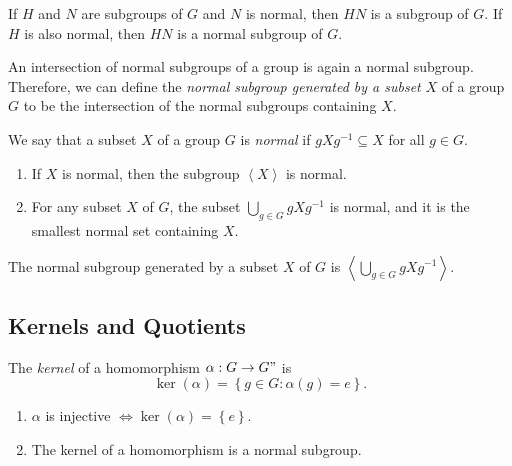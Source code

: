 \begin{theorem}
  If \( H \) and \( N \) are subgroups of \( G \) and \( N \) is normal, then \( HN \) is a subgroup of \( G \).
  If \( H \) is also normal, then \( HN \) is a normal subgroup of \( G \).
\end{theorem}
\begin{proposition}
  An intersection of normal subgroups of a group is again a normal subgroup.
  Therefore, we can define the \emph{normal subgroup generated by a subset} \( X \) of a group \( G \) to be the intersection of the normal subgroups containing \( X \).
\end{proposition}

\begin{definition}
  We say that a subset \( X \) of a group \( G \) is \emph{normal} if \( gXg^{-1} \subseteq X \) for all \( g \in G \).
\end{definition}

\begin{lemma}
  \begin{enumerate}
    \item If \( X \) is normal, then the subgroup \( \left\langle X \right\rangle \) is normal.
    \item For any subset \( X \) of \( G \), the subset \( \bigcup_{g \in G} g X g^{-1} \) is normal, and it is the smallest normal set containing \( X \).
  \end{enumerate}
\end{lemma}

\begin{proposition}
  The normal subgroup generated by a subset \( X \) of \( G \) is \( \left\langle \bigcup_{g \in G} g X g^{-1} \right\rangle \).
\end{proposition}

\subsection{Kernels and Quotients}

\begin{definition}
  The \emph{kernel} of a homomorphism \( \alpha: G\to G" \) is
  \[
    \ker (\alpha) = \left\lbrace g \in G: \alpha(g) = e \right\rbrace.
  \]
\end{definition}
\begin{proposition}
  \begin{enumerate}
    \item \( \alpha \) is injective \( \iff \ker (\alpha) = \left\lbrace e \right\rbrace \).
    \item The kernel of a homomorphism is a normal subgroup.
  \end{enumerate}
\end{proposition}

